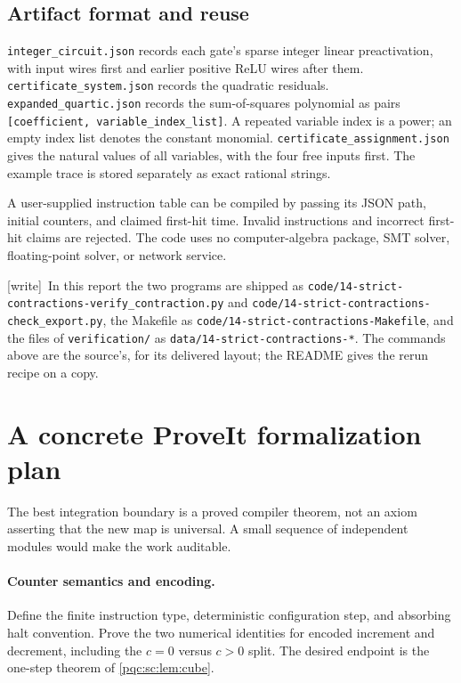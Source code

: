 \documentclass[11pt,letterpaper]{article}
\numberwithin{equation}{section}
\theoremstyle{definition}
\theoremstyle{remark}
\newcommand{\code}[1]{\nolinkurl{#1}}
\newcommand{\wtag}{\textup{[write]}}
\newcommand{\srcmark}[1]{\par\noindent{\small\itshape [source~#1]}\par}
\begin{document}
\subsection{Artifact format and reuse}

\code{integer_circuit.json} records each gate's sparse integer linear
preactivation, with input wires first and earlier positive ReLU wires after
them. \code{certificate_system.json} records the quadratic residuals.
\code{expanded_quartic.json} records the sum-of-squares polynomial as pairs
\code{[coefficient, variable_index_list]}. A repeated variable index is a
power; an empty index list denotes the constant monomial.
\code{certificate_assignment.json} gives the natural values of all
variables, with the four free inputs first. The example trace is stored
separately as exact rational strings.

A user-supplied instruction table can be compiled by passing its JSON path,
initial counters, and claimed first-hit time. Invalid instructions and
incorrect first-hit claims are rejected. The code uses no computer-algebra
package, SMT solver, floating-point solver, or network service.

\wtag\ In this report the two programs are shipped as
\code{code/14-strict-contractions-verify_contraction.py} and
\code{code/14-strict-contractions-check_export.py}, the Makefile as
\code{code/14-strict-contractions-Makefile}, and the files of
\code{verification/} as \code{data/14-strict-contractions-*}. The commands above
are the source's, for its delivered layout; the README gives the rerun recipe
on a copy.

\section{A concrete ProveIt formalization plan}\label{pqc:sc:sec:formal}
\srcmark{14}

The best integration boundary is a proved compiler theorem, not an axiom
asserting that the new map is universal. A small sequence of independent
modules would make the work auditable.

\paragraph{Counter semantics and encoding.}
Define the finite instruction type, deterministic configuration step, and
absorbing halt convention. Prove the two numerical identities for encoded
increment and decrement, including the $c=0$ versus $c>0$ split. The desired
endpoint is the one-step theorem of \cref{pqc:sc:lem:cube}.
\end{document}
